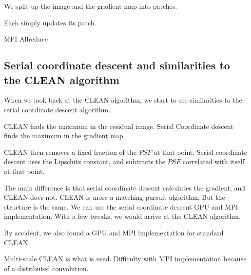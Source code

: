 We split up the image and the gradient map into patches.

Each simply updates its patch.

MPI Allreduce


\subsection{Serial coordinate descent and similarities to the CLEAN algorithm}
When we look back at the CLEAN algorithm, we start to see similarities to the serial coordinate descent algorithm. 

CLEAN finds the maximum in the residual image. Serial Coordinate descent finds the maximum in the gradient map.

CLEAN then removes a fixed fraction of the $PSF$ at that point. Serial coordinate descent uses the Lipschitz constant, and subtracts the $PSF$ correlated with itself at that point.

The main difference is that serial coordinate descent calculates the gradient, and CLEAN does not. CLEAN is more a matching pursuit algorithm. But the structure is the same. We can use the serial coordinate descent GPU and MPI implementation. With a few tweaks, we would arrive at the CLEAN algorithm.

By accident, we also found a GPU and MPI implementation for standard CLEAN.

Multi-scale CLEAN is what is used. Difficulty with MPI implementation because of a distributed convolution.

